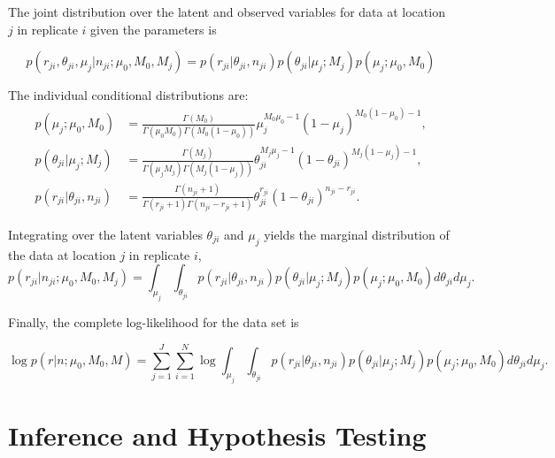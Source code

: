 \documentclass[11pt,reqno]{amsart}
\begin{document}
The joint distribution over the latent and observed variables for data at location $j$ in replicate $i$ given the parameters is

\begin{equation}\label{eqn:jointpdf}
p \left( r_{ji}, \theta_{ji}, \mu_j | n_{ji}; \mu_0, M_0, M_j \right) = p \left( r_{ji} | \theta_{ji}, n_{ji} \right) p\left( \theta_{ji} | \mu_j; M_j \right) p\left( \mu_j; \mu_0, M_0 \right)
\end{equation}

The individual conditional distributions are:
\begin{align}
p\left( \mu_j; \mu_0, M_0 \right)  &= \frac{ \Gamma(M_0) } { \Gamma(\mu_0 M_0) \Gamma(M_0 (1-\mu_0)) } \mu_j^{M_0\mu_0 -1} (1 - \mu_j)^{M_0 ( 1 - \mu_0) - 1}, \nonumber \\
p\left( \theta_{ji} | \mu_j; M_j \right) &= \frac{ \Gamma(M_j) } { \Gamma(\mu_j M_j) \Gamma(M_j (1-\mu_j)) } \theta_{ji}^{M_j\mu_j -1} (1 - \theta_{ji})^{M_j ( 1 - \mu_j) - 1}, \nonumber \\
p \left( r_{ji} | \theta_{ji}, n_{ji} \right) &= \frac{ \Gamma(n_{ji}+1) } { \Gamma(r_{ji}+1) \Gamma( n_{ji} - r_{ji} + 1 ) } \theta_{ji}^{r_{ji}} (1 - \theta_{ji})^{n_{ji} - r_{ji}}. \nonumber
\end{align}

Integrating over the latent variables $\theta_{ji}$ and $\mu_j$ yields the marginal distribution of the data at location $j$ in replicate $i$, 
\begin{equation}
p \left( r_{ji} | n_{ji} ; \mu_0, M_0, M_j \right) = \int_{\mu_j} \int_{\theta_{ji}}  p \left( r_{ji} | \theta_{ji}, n_{ji} \right) p\left( \theta_{ji} | \mu_j; M_j \right) p\left( \mu_j; \mu_0, M_0 \right) d\theta_{ji} d\mu_j.
\end{equation}

Finally, the complete log-likelihood for the data set is

\begin{equation}
\log p \left( r | n ; \mu_0, M_0, M \right) = \sum_{j=1}^J \sum_{i=1}^N \log \int_{\mu_j} \int_{\theta_{ji}}  p \left( r_{ji} | \theta_{ji}, n_{ji} \right) p\left( \theta_{ji} | \mu_j; M_j \right) p\left( \mu_j; \mu_0, M_0 \right) d\theta_{ji} d\mu_j.
\end{equation}


\section{Inference and Hypothesis Testing}
\end{document}
